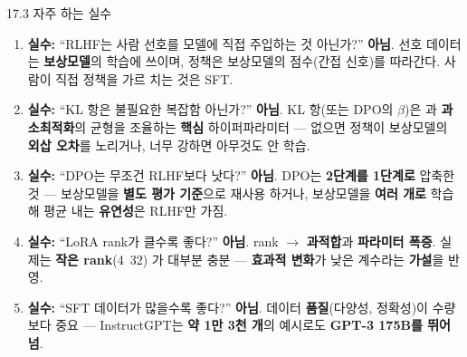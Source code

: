 \begin{frame}{17.3 자주 하는 실수}
  \begin{enumerate}
    \item \textbf{실수:} ``RLHF는 사람 선호를 모델에 직접
      주입하는 것 아닌가?'' \textbf{아님}. 선호 데이터는
      \textbf{보상모델}의 학습에 쓰이며, 정책은 보상모델의
      점수(간접 신호)를 따라간다. 사람이 직접 정책을 가르
      치는 것은 SFT.
    \item \textbf{실수:} ``KL 항은 불필요한 복잡함 아닌가?''
      \textbf{아님}. KL 항(또는 DPO의 $\beta$)은
      과 \textbf{과소최적화}의 균형을
      조율하는 \textbf{핵심} 하이퍼파라미터 — 없으면
      정책이 보상모델의 \textbf{외삽 오차}를 노리거나,
      너무 강하면 아무것도 안 학습.
    \item \textbf{실수:} ``DPO는 무조건 RLHF보다 낫다?''
      \textbf{아님}. DPO는 \textbf{2단계를 1단계로} 압축한
      것 — 보상모델을 \textbf{별도 평가 기준}으로 재사용
     하거나, 보상모델을 \textbf{여러 개로} 학습해 평균
      내는 \textbf{유연성}은 RLHF만 가짐.
    \item \textbf{실수:} ``LoRA rank가 클수록 좋다?''
      \textbf{아님}. rank $\to$ \textbf{과적합}과
      \textbf{파라미터 폭증}. 실제는 \textbf{작은 rank}(4~32)
      가 대부분 충분 — \textbf{효과적 변화}가 낮은
      계수라는 \textbf{가설}을 반영.
    \item \textbf{실수:} ``SFT 데이터가 많을수록 좋다?''
      \textbf{아님}. 데이터 \textbf{품질}(다양성,
      정확성)이 수량보다 중요 — InstructGPT는
      \textbf{약 1만 3천 개}의 예시로도 \textbf{GPT-3
      175B를 뛰어넘}.
  \end{enumerate}
\end{frame}
